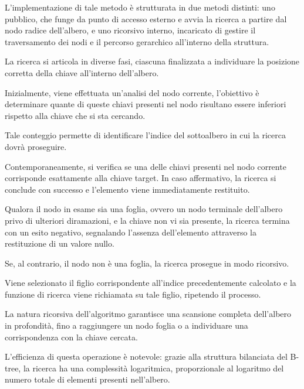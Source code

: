 \documentclass[12pt,a4paper,openright,twoside]{book}
\begin{document}
                    L'implementazione di tale metodo è strutturata in due metodi distinti: uno pubblico, che funge da punto di accesso esterno e avvia la ricerca a partire dal nodo radice dell'albero, e uno ricorsivo interno, incaricato di gestire il traversamento dei nodi e il percorso gerarchico all'interno della struttura.
                    
                    La ricerca si articola in diverse fasi, ciascuna finalizzata a individuare la posizione corretta della chiave all'interno dell'albero.

                    Inizialmente, viene effettuata un'analisi del nodo corrente, l'obiettivo è determinare quante di queste chiavi presenti nel nodo risultano essere inferiori rispetto alla chiave che si sta cercando.

                    Tale conteggio permette di identificare l'indice del sottoalbero in cui la ricerca dovrà proseguire.
                    
                    Contemporaneamente, si verifica se una delle chiavi presenti nel nodo corrente corrisponde esattamente alla chiave target. In caso affermativo, la ricerca si conclude con successo e l'elemento viene immediatamente restituito.
                    
                    Qualora il nodo in esame sia una foglia, ovvero un nodo terminale dell'albero privo di ulteriori diramazioni, e la chiave non vi sia presente, la ricerca termina con un esito negativo, segnalando l'assenza dell'elemento attraverso la restituzione di un valore nullo.
                    
                    Se, al contrario, il nodo non è una foglia, la ricerca prosegue in modo ricorsivo.

                    Viene selezionato il figlio corrispondente all'indice precedentemente calcolato e la funzione di ricerca viene richiamata su tale figlio, ripetendo il processo.
                    
                    La natura ricorsiva dell'algoritmo garantisce una scansione completa dell'albero in profondità, fino a raggiungere un nodo foglia o a individuare una corrispondenza con la chiave cercata.
                    
                    L'efficienza di questa operazione è notevole: grazie alla struttura bilanciata del B-tree, la ricerca ha una complessità logaritmica, proporzionale al logaritmo del numero totale di elementi presenti nell'albero.
\end{document}
